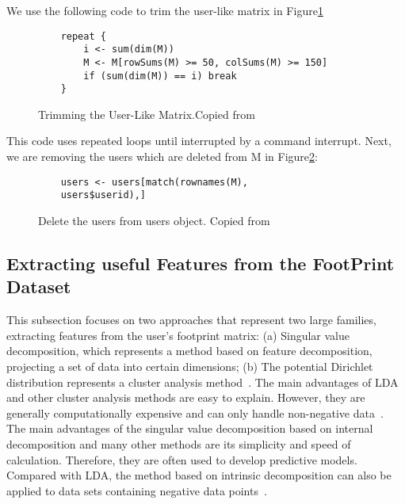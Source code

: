 We use the following code to trim the user-like 
matrix in Figure\ref{F:Trimming}

\begin{figure}[htb]
\begin{footnotesize}
\begin{verbatim}
    repeat {
        i <- sum(dim(M))
        M <- M[rowSums(M) >= 50, colSums(M) >= 150]
        if (sum(dim(M)) == i) break
    }
\end{verbatim}
\end{footnotesize}
\caption{Trimming the User-Like Matrix.Copied from~\cite{hid515-12}}
\label{F:Trimming}
\end{figure}


This code uses repeated loops until interrupted by a command 
interrupt. 
Next, we are removing the users which are deleted from M in 
Figure\ref{F:delete}:

\begin{figure}[htb]
\begin{footnotesize}
\begin{verbatim}
    users <- users[match(rownames(M),
    users$userid),]
\end{verbatim}
\end{footnotesize}
\caption{Delete the users from users object. 
Copied from~\cite{hid515-12}}
\label{F:delete}
\end{figure}


\subsection{Extracting useful Features from the FootPrint 
Dataset~\cite{hid515-12}}

This subsection focuses on two approaches that represent two large 
families, extracting features from the user's footprint matrix: 
(a) Singular value decomposition, which represents a method based 
on feature decomposition, projecting a set of data into 
certain dimensions; (b) The potential Dirichlet distribution 
represents a cluster analysis method~\cite{hid515-12}. 
The main advantages of LDA 
and other cluster analysis methods are easy to explain. However, 
they are generally computationally expensive and can only handle 
non-negative data~\cite{hid515-12}. 
The main 
advantages of the singular value decomposition based on internal 
decomposition and many other methods are its simplicity and speed 
of calculation. Therefore, they are often used to develop 
predictive models. Compared with LDA, the method based on 
intrinsic decomposition can also be applied to data sets containing
 negative data points~\cite{hid515-12}.

